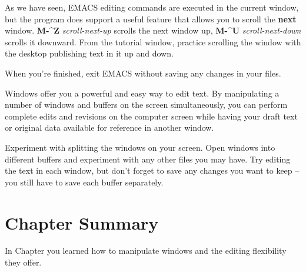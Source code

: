 As we have seen, EMACS editing commands are executed in the current
window, but the program does support a useful feature that allows you to
scroll the {\bf{}next} window.  {\bf{}M-\^{}Z} {\it{}scroll-next-up}
 scrolls the next window up, {\bf{}M-\^{}U}
{\it{}scroll-next-down}  scrolls it downward.  From
the tutorial window, practice scrolling the window with the desktop
publishing text in it up and down.

When you're finished, exit EMACS without saving any changes in your
files.

Windows offer you a powerful and easy way to edit text.  By
manipulating a number of windows and buffers on the screen
simultaneously, you can perform complete edits and revisions on the
computer screen while having your draft text or original data
available for reference in another window.

Experiment with splitting the windows on your screen.  Open windows into
different buffers and experiment with any other files you may have.  Try
editing the text in each window, but
don't forget to save any changes you want to keep -- you still have to
save each buffer separately.

\section{Chapter \thechapter{} Summary}

In Chapter \thechapter{} you learned how to manipulate windows and the
editing flexibility they offer.


